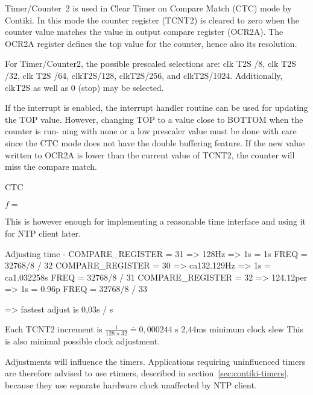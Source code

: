 Timer/Counter~2 is used in Clear Timer on Compare Match (CTC) mode by Contiki.
In this mode the counter register (TCNT2) is cleared to zero when the counter
value matches the value in output compare register (OCR2A).
The OCR2A register defines the top value for the counter, hence also its resolution.

For Timer/Counter2, the possible prescaled selections are: clk T2S /8, clk T2S /32, clk T2S /64,
clkT2S/128, clkT2S/256, and clkT2S/1024. Additionally, clkT2S as well as 0 (stop) may be selected.

If the interrupt is enabled, the interrupt handler routine can be used for updating
the TOP value. However, changing TOP to a value close to BOTTOM when the counter is run-
ning with none or a low prescaler value must be done with care since the CTC mode does not
have the double buffering feature. If the new value written to OCR2A is lower than the current
value of TCNT2, the counter will miss the compare match.

CTC

$f = $


This is however enough for implementing a reasonable time interface and using it for NTP client later.



Adjusting time - COMPARE\_REGISTER = 31 => 128Hz => 1s = 1s
FREQ = 32768/8 / 32
COMPARE\_REGISTER = 30 => ca132.129Hz => 1s = ca1.032258s
FREQ = 32768/8 / 31
COMPARE\_REGISTER = 32 => 124.12per => 1s = 0.96p
FREQ = 32768/8 / 33

=> fastest adjust is 0,03s / s


Each TCNT2 increment is $\frac{1}{128 \times 32} \doteq 0,000244$ s
2,44ms minimum clock slew
This is also minimal possible clock adjustment.


Adjustments will influence the timers.
Applications requiring uninfluenced timers
are therefore advised to use rtimers, described in section~\ref{sec:contiki-timers},
because they use separate hardware clock
unaffected by NTP client.
